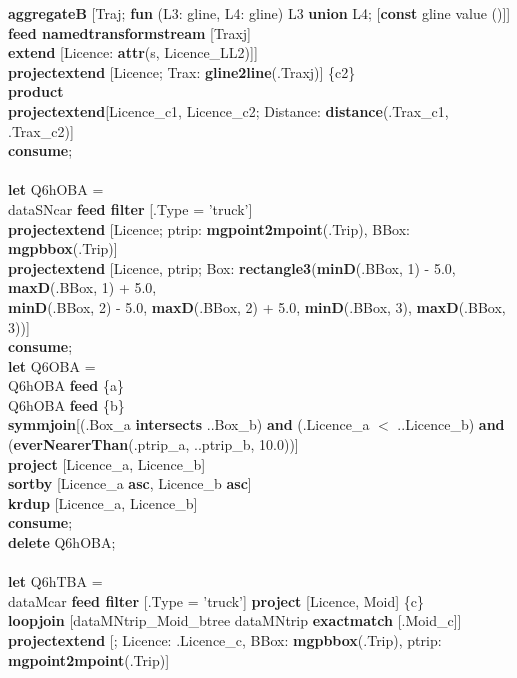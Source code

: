 \documentclass[a4paper]{article}
\newcommand{\op}[1]{\textbf{#1}}
\begin{document}
\begin{scriptsize}
\begin{tabbing}
\>\>\>\op{aggregateB} [Traj; \op{fun} (L3: gline, L4: gline) L3 \op{union} L4; [\op{const} gline value ()]]\\
\>\>\>\op{feed namedtransformstream} [Traxj]\\
\>\>\>\op{extend} [Licence: \op{attr}(s, Licence\_LL2)]]\\
\>\>\op{projectextend} [Licence; Trax: \op{gline2line}(.Traxj)] \{c2\}\\
\>\op{product}\\
\>\op{projectextend}[Licence\_c1, Licence\_c2; Distance: \op{distance}(.Trax\_c1, .Trax\_c2)]\\
\op{consume};\\
\\
\op{let} Q6hOBA =\\
\>dataSNcar \op{feed filter} [.Type = 'truck']\\
\>\op{projectextend} [Licence; ptrip: \op{mgpoint2mpoint}(.Trip), BBox: \op{mgpbbox}(.Trip)]\\
\>\op{projectextend} [Licence, ptrip; Box: \op{rectangle3}(\op{minD}(.BBox, 1) - 5.0, \op{maxD}(.BBox, 1) + 5.0,\\
\>\>\>\>\op{minD}(.BBox, 2) - 5.0, \op{maxD}(.BBox, 2) + 5.0, \op{minD}(.BBox, 3), \op{maxD}(.BBox, 3))]\\
\op{consume};\\
\op{let} Q6OBA =\\
\>Q6hOBA \op{feed} \{a\}\\
\>Q6hOBA \op{feed} \{b\}\\
\>\op{symmjoin}[(.Box\_a \op{intersects} ..Box\_b) \op{and} (.Licence\_a $<$ ..Licence\_b) \op{and}\\
\>\>\>\>(\op{everNearerThan}(.ptrip\_a, ..ptrip\_b, 10.0))]\\
\>\op{project} [Licence\_a, Licence\_b]\\
\>\op{sortby} [Licence\_a \op{asc}, Licence\_b \op{asc}]\\
\>\op{krdup} [Licence\_a, Licence\_b]\\
\op{consume};\\
\op{delete} Q6hOBA;\\
\\
\op{let} Q6hTBA =\\
\>dataMcar \op{feed filter} [.Type = 'truck'] \op{project} [Licence, Moid] \{c\}\\
\>\op{loopjoin} [dataMNtrip\_Moid\_btree dataMNtrip \op{exactmatch} [.Moid\_c]]\\
\>\op{projectextend} [; Licence: .Licence\_c, BBox: \op{mgpbbox}(.Trip), ptrip: \op{mgpoint2mpoint}(.Trip)]\\

\end{tabbing}
\end{scriptsize}
\end{document}
